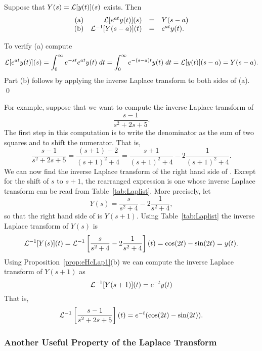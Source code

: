 \documentclass{ximera}
\begin{document}
\begin{prop}  \label{prop:eHcLap1}
Suppose that $Y(s)={\cal L}[y(t)](s)$ exists.  Then
\[
\begin{array}{rrcl}
\mbox{(a)} & {\cal L}[e^{at}y(t)](s) & = & Y(s-a)\\
\mbox{(b)} & {\cal L}^{-1}[Y(s-a)](t) & = & e^{at}y(t).
\end{array}
\]
\end{prop}

\proof  To verify (a) compute
\[
{\cal L}[e^{at}y(t)](s) = \int_0^{\infty} e^{-st}e^{at} y(t)\; dt
= \int_0^{\infty} e^{-(s-a)t} y(t)\; dt = {\cal L}[y(t)](s-a) = Y(s-a).
\]
Part (b) follows by applying the inverse Laplace transform to both sides 
of (a).  \qed

For example, suppose that we want to compute the inverse Laplace transform of 
\begin{equation}  \label{e:exlappf}
\frac{s-1}{s^2+2s+5}.
\end{equation}
The first step in this computation is to write the denominator as the sum of 
two squares and to shift the numerator.   That is,
\begin{equation}  \label{e:pf1}
\frac{s-1}{s^2+2s+5} = \frac{(s+1)-2}{(s+1)^2+4} = 
\frac{s+1}{(s+1)^2+4} - 2\frac{1}{(s+1)^2+4}.
\end{equation}
We can now find the inverse Laplace transform of the right hand side of 
.  Except for the shift of $s$ to $s+1$, the rearranged expression 
 is one whose inverse Laplace transform can be read from 
Table~\ref{tab:Laplist}.  More precisely, let 
\[
Y(s) = \frac{s}{s^2+4} - 2\frac{1}{s^2+4},
\]
so that the right hand side of  is $Y(s+1)$.  Using 
Table~\ref{tab:Laplist} the inverse Laplace transform of $Y(s)$ is
\begin{equation}  \label{e:exlappf2}
{\cal L}^{-1}[Y(s)](t) = 
{\cal L}^{-1}\left[\frac{s}{s^2+4} - 2\frac{1}{s^2+4}\right](t) = 
\cos(2t) - \sin(2t) = y(t).
\end{equation}
Using Proposition~\ref{prop:eHcLap1}(b) we can compute the inverse Laplace 
transform of $Y(s+1)$ 
as
\[
{\cal L}^{-1}[Y(s+1)](t) = e^{-t}y(t)
\]
That is,
\[
{\cal L}^{-1}\left[\frac{s-1}{s^2+2s+5}\right](t) = e^{-t}(\cos(2t)-\sin(2t)).
\]

\subsubsection*{Another Useful Property of the Laplace Transform}
\end{document}
